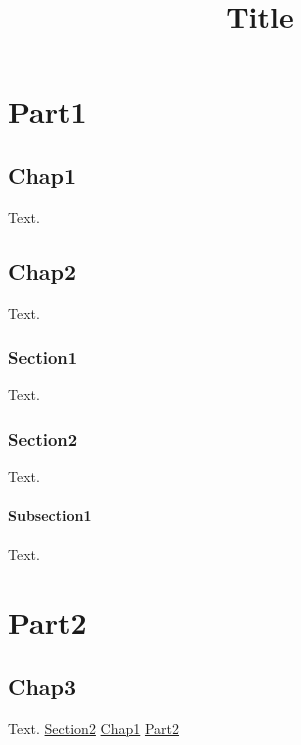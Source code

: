 \documentclass[a4paper,11pt]{book}
\title{Title}
\author{}
\date{}
\begin{document}
\part{Part1}
\label{s:1}
\chapter{Chap1}
\label{s:2}
Text.

\chapter{Chap2}
\label{s:3}
Text.

\section{Section1}
\label{s:4}
Text.

\section{Section2}
\label{s:5}
Text.

\subsection{Subsection1}
\label{s:6}
Text.

\part{Part2}
\label{s:7}
\chapter{Chap3}
\label{s:8}
Text.
\hyperref[s:5]{Section2}
\hyperref[s:2]{Chap1}
\hyperref[s:7]{Part2}
\end{document}
